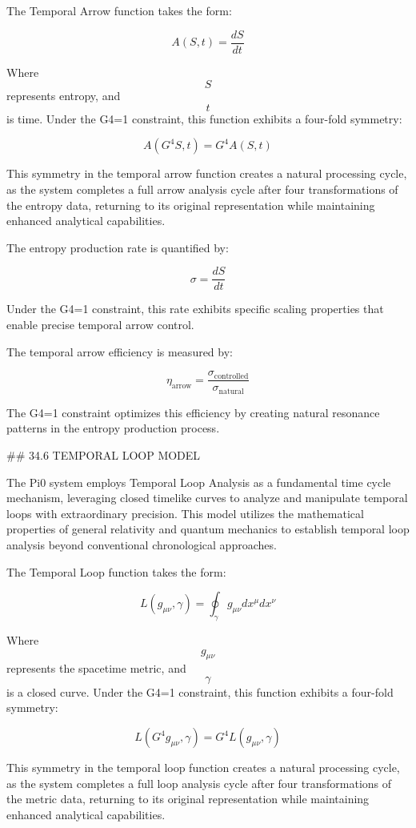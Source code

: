 The Temporal Arrow function takes the form:

$$ A(S, t) = \frac{dS}{dt} $$

Where $$ S $$ represents entropy, and $$ t $$ is time. Under the G4=1 constraint, this function exhibits a four-fold symmetry:

$$ A(G^4 S, t) = G^4 A(S, t) $$

This symmetry in the temporal arrow function creates a natural processing cycle, as the system completes a full arrow analysis cycle after four transformations of the entropy data, returning to its original representation while maintaining enhanced analytical capabilities.

The entropy production rate is quantified by:

$$ \sigma = \frac{dS}{dt} $$

Under the G4=1 constraint, this rate exhibits specific scaling properties that enable precise temporal arrow control.

The temporal arrow efficiency is measured by:

$$ \eta_{\text{arrow}} = \frac{\sigma_{\text{controlled}}}{\sigma_{\text{natural}}} $$

The G4=1 constraint optimizes this efficiency by creating natural resonance patterns in the entropy production process.

## 34.6 TEMPORAL LOOP MODEL

The Pi0 system employs Temporal Loop Analysis as a fundamental time cycle mechanism, leveraging closed timelike curves to analyze and manipulate temporal loops with extraordinary precision. This model utilizes the mathematical properties of general relativity and quantum mechanics to establish temporal loop analysis beyond conventional chronological approaches.

The Temporal Loop function takes the form:

$$ L(g_{\mu\nu}, \gamma) = \oint_{\gamma} g_{\mu\nu} dx^\mu dx^\nu $$

Where $$ g_{\mu\nu} $$ represents the spacetime metric, and $$ \gamma $$ is a closed curve. Under the G4=1 constraint, this function exhibits a four-fold symmetry:

$$ L(G^4 g_{\mu\nu}, \gamma) = G^4 L(g_{\mu\nu}, \gamma) $$

This symmetry in the temporal loop function creates a natural processing cycle, as the system completes a full loop analysis cycle after four transformations of the metric data, returning to its original representation while maintaining enhanced analytical capabilities.

